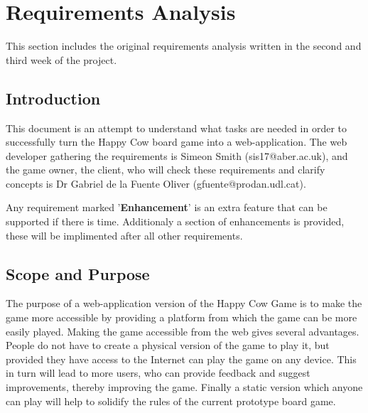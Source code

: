 \newcommand{\pA}{\textbf{Core Phase (1):} }
\newcommand{\pB}{\textbf{Usability Phase (2):} }
\newcommand{\pC}{\textbf{Group Phase (3):} }
\newcommand{\pD}{\textbf{Extra Phase (4):} }

\chapter{Requirements Analysis}
This section includes the original requirements analysis written in the second and third week of the project.

\section{Introduction}

This document is an attempt to understand what tasks are needed in order to successfully turn the Happy Cow board game into a web-application. The web developer gathering the requirements is Simeon Smith (sis17@aber.ac.uk), and the game owner, the client, who will check these requirements and clarify concepts is Dr Gabriel de la Fuente Oliver (gfuente@prodan.udl.cat).

Any requirement marked '\textbf{Enhancement}' is an extra feature that can be supported if there is time. Additionaly a section of enhancements is provided, these will be implimented after all other requirements.

\section{Scope and Purpose}

The purpose of a web-application version of the Happy Cow Game is to make the game more accessible by providing a platform from which the game can be more easily played. Making the game accessible from the web gives several advantages. People do not have to create a physical version of the game to play it, but provided they have access to the Internet can play the game on any device. This in turn will lead to more users, who can provide feedback and suggest improvements, thereby improving the game. Finally a static version which anyone can play will help to solidify the rules of the current prototype board game.

